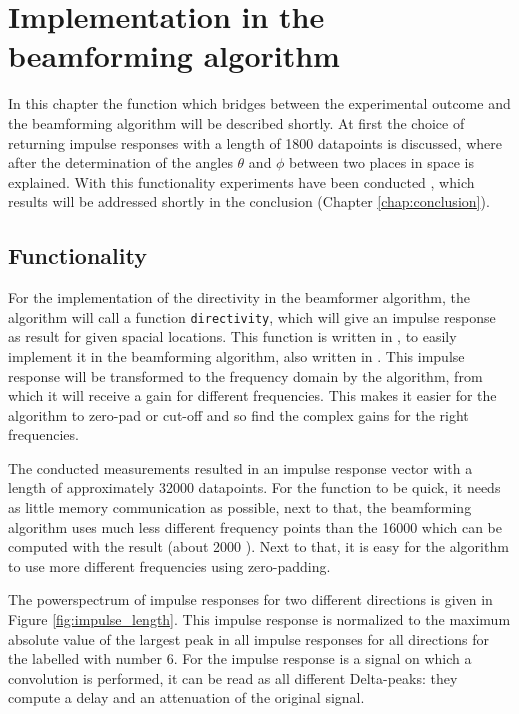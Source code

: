 \chapter{Implementation in the beamforming algorithm}
\label{chap:implementation}

In this chapter the function which bridges between the experimental outcome and the beamforming algorithm will be described shortly.
At first the choice of returning impulse responses with a length of 1800 datapoints is discussed, where after the determination of the angles $\theta$ and $\phi$ between two places in space is explained.
With this functionality experiments have been conducted \cite{BAP:ErikNiels}, which results will be addressed shortly in the conclusion (Chapter \ref{chap:conclusion}).

\section{Functionality}
For the implementation of the directivity in the beamformer algorithm, the algorithm will call a function \texttt{directivity}, which will give an impulse response as result for given spacial locations.
This function is written in \matlab, to easily implement it in the beamforming algorithm, also written in {\matlab} \cite{BAP:ErikNiels}.
This impulse response will be transformed to the frequency domain by the algorithm, from which it will receive a gain for different frequencies.
This makes it easier for the algorithm to zero-pad or cut-off and so find the complex gains for the right frequencies.

The conducted measurements resulted in an impulse response vector with a length of approximately 32000 datapoints.
For the function to be quick, it needs as little memory communication as possible, next to that, the beamforming algorithm uses much less different frequency points  than the 16000 which can be computed with the result (about 2000 \cite{BAP:ErikNiels}).
Next to that, it is easy for the algorithm to use more different frequencies using zero-padding.

The powerspectrum of impulse responses for two different directions is given in Figure \ref{fig:impulse_length}. 
This impulse response is normalized to the maximum absolute value of the largest peak in all impulse responses for all directions for the {\nexus} labelled with number 6.
For the impulse response is a signal on which a convolution is performed, it can be read as all different Delta-peaks: they compute a delay and an attenuation of the original signal.

